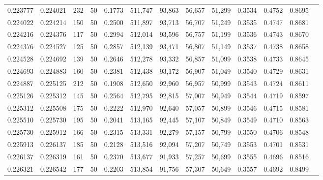 \begin{tabular}{rrrrrrrrrrrrr}
0.223777 & 0.224021 &   232 &  50 &                                     0.1773 & 511,747 &  93,863 &  56,657 &  51,299 & 0.3534 & 0.4752 & 0.8695 \\
0.224022 & 0.224214 &   150 &  50 &                                     0.2500 & 511,897 &  93,713 &  56,707 &  51,249 & 0.3535 & 0.4747 & 0.8681 \\
0.224216 & 0.224376 &   117 &  50 &                                     0.2994 & 512,014 &  93,596 &  56,757 &  51,199 & 0.3536 & 0.4743 & 0.8670 \\
0.224376 & 0.224527 &   125 &  50 &                                     0.2857 & 512,139 &  93,471 &  56,807 &  51,149 & 0.3537 & 0.4738 & 0.8658 \\
0.224528 & 0.224692 &   139 &  50 &                                     0.2646 & 512,278 &  93,332 &  56,857 &  51,099 & 0.3538 & 0.4733 & 0.8645 \\
0.224693 & 0.224883 &   160 &  50 &                                     0.2381 & 512,438 &  93,172 &  56,907 &  51,049 & 0.3540 & 0.4729 & 0.8631 \\
0.224887 & 0.225125 &   212 &  50 &                                     0.1908 & 512,650 &  92,960 &  56,957 &  50,999 & 0.3543 & 0.4724 & 0.8611 \\
0.225126 & 0.225312 &   145 &  50 &                                     0.2564 & 512,795 &  92,815 &  57,007 &  50,949 & 0.3544 & 0.4719 & 0.8597 \\
0.225312 & 0.225508 &   175 &  50 &                                     0.2222 & 512,970 &  92,640 &  57,057 &  50,899 & 0.3546 & 0.4715 & 0.8581 \\
0.225510 & 0.225730 &   195 &  50 &                                     0.2041 & 513,165 &  92,445 &  57,107 &  50,849 & 0.3549 & 0.4710 & 0.8563 \\
0.225730 & 0.225912 &   166 &  50 &                                     0.2315 & 513,331 &  92,279 &  57,157 &  50,799 & 0.3550 & 0.4706 & 0.8548 \\
0.225913 & 0.226137 &   185 &  50 &                                     0.2128 & 513,516 &  92,094 &  57,207 &  50,749 & 0.3553 & 0.4701 & 0.8531 \\
0.226137 & 0.226319 &   161 &  50 &                                     0.2370 & 513,677 &  91,933 &  57,257 &  50,699 & 0.3555 & 0.4696 & 0.8516 \\
0.226321 & 0.226542 &   177 &  50 &                                     0.2203 & 513,854 &  91,756 &  57,307 &  50,649 & 0.3557 & 0.4692 & 0.8499 \\

\end{tabular}
